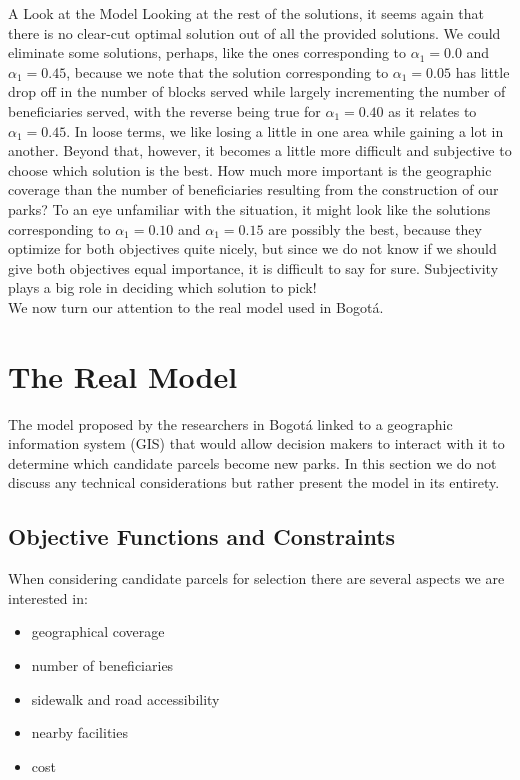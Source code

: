 \documentclass[12pt]{pom_thesis}
\theoremstyle{definition}
\begin{document}
\begin{chapter}{A Look at the Model}
Looking at the rest of the solutions, it seems again that there is no clear-cut optimal solution out of all the provided solutions. We could eliminate some solutions, perhaps, like the ones corresponding to $\alpha_1 = 0.0$ and $\alpha_1 = 0.45$, because we note that the solution corresponding to $\alpha_1 = 0.05$ has little drop off in the number of blocks served while largely incrementing the number of beneficiaries served, with the reverse being true for $\alpha_1 = 0.40$ as it relates to $\alpha_1 = 0.45$. In loose terms, we like losing a little in one area while gaining a lot in another. Beyond that, however, it becomes a little more difficult and subjective to choose which solution is the best. How much more important is the geographic coverage than the number of beneficiaries resulting from the construction of our parks? To an eye unfamiliar with the situation, it might look like the solutions corresponding to $\alpha_1 = 0.10$ and $\alpha_1 = 0.15$ are possibly the best, because they optimize for both objectives quite nicely, but since we do not know if we should give both objectives equal importance, it is difficult to say for sure. Subjectivity plays a big role in deciding which solution to pick! \\

We now turn our attention to the real model used in Bogot\'{a}.
%
%
\section{The Real Model}
The model proposed by the researchers in Bogot\'{a} linked to a geographic information system (GIS) that would allow decision makers to interact with it to determine which candidate parcels become new parks. In this section we do not discuss any technical considerations but rather present the model in its entirety. \\

%
%
\subsection{Objective Functions and Constraints}
When considering candidate parcels for selection there are several aspects we are interested in:
\begin{itemize}
\item geographical coverage 
\item number of beneficiaries
\item sidewalk and road accessibility
\item nearby facilities
\item cost 
\end{itemize}


\end{chapter}
\end{document}
